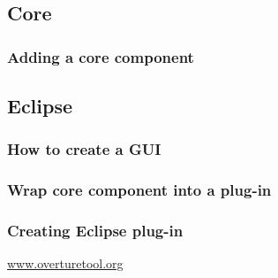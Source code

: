\subsection{Core}
\frame
{
  \frametitle{Adding a core component}


\begin{center}
 
\end{center}
}

\subsection{Eclipse}


\frame
{
  \frametitle{How to create a GUI}


\begin{center}
 
\end{center}
}

\frame
{
  \frametitle{Wrap core component into a plug-in}


\begin{center}
 
\end{center}
}

\frame
{
  \frametitle{Creating Eclipse plug-in}


\begin{center}
 
\end{center}
}



\begin{frame}[plain,c]
  \begin{center}
	\LARGE {}

	\vspace{2cm}
	\href{www.overturetool.org}{www.overturetool.org}
\end{center}
\end{frame}
